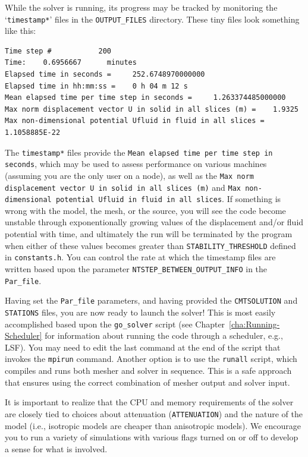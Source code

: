 While the solver is running, its progress may be tracked by monitoring
the `\texttt{timestamp{*}}' files in the \texttt{OUTPUT\_FILES} directory.
These tiny files look something like this:
{\small
\begin{verbatim}
Time step #           200
Time:    0.6956667      minutes
Elapsed time in seconds =     252.6748970000000
Elapsed time in hh:mm:ss =    0 h 04 m 12 s
Mean elapsed time per time step in seconds =     1.263374485000000
Max norm displacement vector U in solid in all slices (m) =    1.9325
Max non-dimensional potential Ufluid in fluid in all slices = 1.1058885E-22
\end{verbatim}
}
The \texttt{timestamp{*}} files provide the \texttt{Mean elapsed time
per time step in seconds}, which may be used to assess performance
on various machines (assuming you are the only user on a node), as
well as the
\texttt{Max norm displacement vector U in solid in all slices (m)}
and
\texttt{Max non-dimensional potential Ufluid in fluid in all slices}.
If something is wrong with the model, the mesh, or the source, you will see the
code become unstable through exponentionally growing values of the
displacement and/or fluid potential with time, and ultimately the
run will be terminated by the program when either of these values
becomes greater than \texttt{STABILITY\_THRESHOLD} defined in \texttt{constants.h}.
You can control the rate at which the timestamp files are written
based upon the parameter \texttt{NTSTEP\_BETWEEN\_OUTPUT\_INFO} in
the \texttt{Par\_file}.\newline


Having set the \texttt{Par\_file} parameters, and having provided
the \texttt{CMTSOLUTION} and \texttt{STATIONS} files, you are now
ready to launch the solver! This is most easily accomplished based
upon the \texttt{go\_solver} script (see Chapter~\ref{cha:Running-Scheduler}
for information about running the code through a scheduler, e.g.,
LSF). You may need to edit the last command at the end of the script
that invokes the \texttt{mpirun} command. Another option is to use
the \texttt{runall} script, which compiles and runs both mesher and
solver in sequence. This is a safe approach that ensures using the
correct combination of mesher output and solver input.\newline


It is important to realize that the CPU and memory requirements of
the solver are closely tied to choices about attenuation (\texttt{ATTENUATION})
and the nature of the model (i.e., isotropic models are cheaper than
anisotropic models). We encourage you to run a variety of simulations
with various flags turned on or off to develop a sense for what is
involved.\newline


